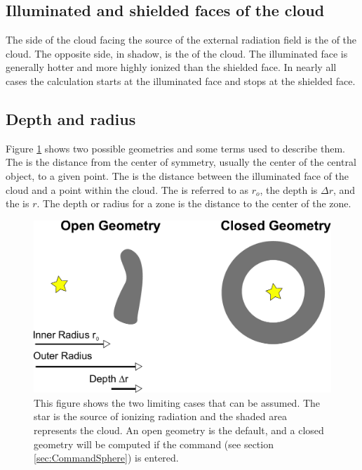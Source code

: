 \subsection{Illuminated and shielded faces of the cloud}

The side of the cloud facing the source of the external radiation field
is the  of the cloud.
The opposite side, in shadow, is the  of the cloud.  
The illuminated face is generally
hotter and more highly ionized than the shielded face.
In nearly all cases the calculation starts at the illuminated face and stops at the shielded face.

\subsection{Depth and radius}

Figure \ref{fig:GeometryOpenClosed} shows two possible geometries
and some terms used to describe them.
The  is the distance from the center of symmetry,
usually the center of the central object, to a given point.
The  is the distance
between the illuminated face of the cloud and a point within the cloud.
The  is referred to as $r_o$,
the depth is $\Delta r$, and the  is $r$.
The depth or radius for a zone is the distance to the center of the zone.

\begin{figure}
\centering
\includegraphics[scale=0.5]{GeometryOpenClosed}
\caption[Open and closed geometries]
{This figure shows the two limiting cases that can be assumed.
The star is the source of ionizing radiation and the shaded area represents
the cloud. An open geometry is the default, and a closed geometry will be
computed if the  command (see section \ref{sec:CommandSphere}) is entered.}
\label{fig:GeometryOpenClosed}
\end{figure}

